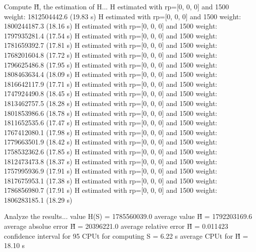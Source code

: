 Compute H̃, the estimation of H...
  H estimated with rp=[0, 0, 0] and 1500 weight:  1812504442.6  (19.83 s)
  H estimated with rp=[0, 0, 0] and 1500 weight:  1800244187.3  (18.16 s)
  H estimated with rp=[0, 0, 0] and 1500 weight:  1797935281.4  (17.54 s)
  H estimated with rp=[0, 0, 0] and 1500 weight:  1781659392.7  (17.81 s)
  H estimated with rp=[0, 0, 0] and 1500 weight:  1768201604.8  (17.72 s)
  H estimated with rp=[0, 0, 0] and 1500 weight:  1796625486.8  (17.95 s)
  H estimated with rp=[0, 0, 0] and 1500 weight:  1808463634.4  (18.09 s)
  H estimated with rp=[0, 0, 0] and 1500 weight:  1816642117.9  (17.71 s)
  H estimated with rp=[0, 0, 0] and 1500 weight:  1747924490.8  (18.45 s)
  H estimated with rp=[0, 0, 0] and 1500 weight:  1813462757.5  (18.28 s)
  H estimated with rp=[0, 0, 0] and 1500 weight:  1801853986.6  (18.78 s)
  H estimated with rp=[0, 0, 0] and 1500 weight:  1811652535.6  (17.47 s)
  H estimated with rp=[0, 0, 0] and 1500 weight:  1767412080.1  (17.98 s)
  H estimated with rp=[0, 0, 0] and 1500 weight:  1779663501.9  (18.42 s)
  H estimated with rp=[0, 0, 0] and 1500 weight:  1758532362.6  (17.85 s)
  H estimated with rp=[0, 0, 0] and 1500 weight:  1812473473.8  (18.37 s)
  H estimated with rp=[0, 0, 0] and 1500 weight:  1757995936.9  (17.91 s)
  H estimated with rp=[0, 0, 0] and 1500 weight:  1817675953.1  (17.38 s)
  H estimated with rp=[0, 0, 0] and 1500 weight:  1786856980.7  (17.91 s)
  H estimated with rp=[0, 0, 0] and 1500 weight:  1806283185.1  (18.29 s)

Analyze the results...
  value H(S)                  = 1785560039.0 
  average value H̃             = 1792203169.6 
  average absolue error H̃     = 20396221.0 
  average relative error H̃    = 0.011423 
  confidence interval for 95%
  CPUt for computing S         = 6.22 s
  average CPUt for H̃           = 18.10 s

